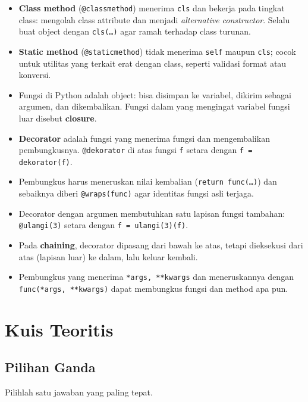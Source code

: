 \begin{itemize}
  \item \textbf{Class method} (\texttt{@classmethod}) menerima \texttt{cls} dan bekerja pada tingkat class: mengolah class attribute dan menjadi \emph{alternative constructor}. Selalu buat object dengan \texttt{cls(\ldots)} agar ramah terhadap class turunan.
  \item \textbf{Static method} (\texttt{@staticmethod}) tidak menerima \texttt{self} maupun \texttt{cls}; cocok untuk utilitas yang terkait erat dengan class, seperti validasi format atau konversi.
  \item Fungsi di Python adalah object: bisa disimpan ke variabel, dikirim sebagai argumen, dan dikembalikan. Fungsi dalam yang mengingat variabel fungsi luar disebut \textbf{closure}.
  \item \textbf{Decorator} adalah fungsi yang menerima fungsi dan mengembalikan pembungkusnya. \texttt{@dekorator} di atas fungsi \texttt{f} setara dengan \texttt{f = dekorator(f)}.
  \item Pembungkus harus meneruskan nilai kembalian (\texttt{return func(\ldots)}) dan sebaiknya diberi \texttt{@wraps(func)} agar identitas fungsi asli terjaga.
  \item Decorator dengan argumen membutuhkan satu lapisan fungsi tambahan: \texttt{@ulangi(3)} setara dengan \texttt{f = ulangi(3)(f)}.
  \item Pada \textbf{chaining}, decorator dipasang dari bawah ke atas, tetapi dieksekusi dari atas (lapisan luar) ke dalam, lalu keluar kembali.
  \item Pembungkus yang menerima \texttt{*args, **kwargs} dan meneruskannya dengan \texttt{func(*args, **kwargs)} dapat membungkus fungsi dan method apa pun.
\end{itemize}

\section{Kuis Teoritis}

\subsection{Pilihan Ganda}

Pilihlah satu jawaban yang paling tepat.

